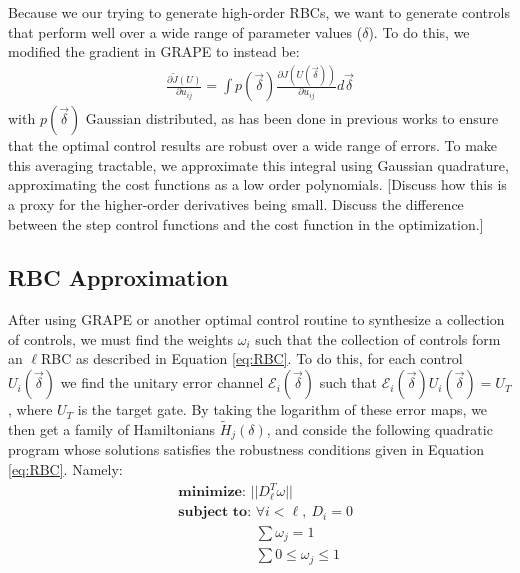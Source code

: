 \documentclass[aps,nofootinbib,pra,notitlepage,twocolumn]{revtex4-1}
\newcommand{\note}[1]{{\color{red}[#1]}}
\begin{document}
Because we our trying to generate high-order RBCs, we want to generate controls that perform well over a wide range of parameter values ($\delta$). To do this, we modified the gradient in GRAPE to instead be:
\begin{align}\label{quadrature}
\frac{\partial \tilde J(U)}{\partial u_{ij}} =
\int p(\vec{\delta})\frac{\partial J(U(\vec{\delta}))}{\partial u_{ij}} d\vec{\delta}
\end{align}
with $p(\vec{\delta})$ Gaussian distributed, as has been done in previous works \cite{Goerz2014} to ensure that the optimal control results are robust over a wide range of errors. To make this averaging tractable, we approximate this integral using Gaussian quadrature, approximating the cost functions as a low order polynomials\cite{abramowiz1972handbook}.
\note{Discuss how this is a proxy for the higher-order derivatives being small. Discuss the difference between the step control functions and the cost function in the optimization.}

\subsection{RBC Approximation}
After using GRAPE or another optimal control routine to synthesize a collection of controls, we must find the weights $\omega_i$ such that the collection of controls form an $\ell$RBC as described in Equation \ref{eq:RBC}. To do this, for each control $U_i(\vec{\delta})$ we find the unitary error channel $\mathcal{E}_i(\vec{\delta})$ such that $\mathcal{E}_i(\vec{\delta})U_i(\vec{\delta})=U_T$, where $U_T$ is the target gate. By taking the logarithm of these error maps, we then get a family of Hamiltonians $\tilde{H}_j(\delta)$, and conside the following quadratic program whose solutions satisfies the robustness conditions given in Equation \ref{eq:RBC}. Namely:
\begin{equation}\label{eq:minimization}
  \begin{split}
    &\textbf{minimize: } ||D_{\ell}^T\omega||\\
    &\textbf{subject to: } \forall i<\ell,\ D_i=0\\
   	&\phantom{\textbf{subject to: }}\sum \omega_j = 1\\
   	&\phantom{\textbf{subject to: }}\sum 0 \le \omega_j \le 1
  \end{split}
\end{equation}
\end{document}
